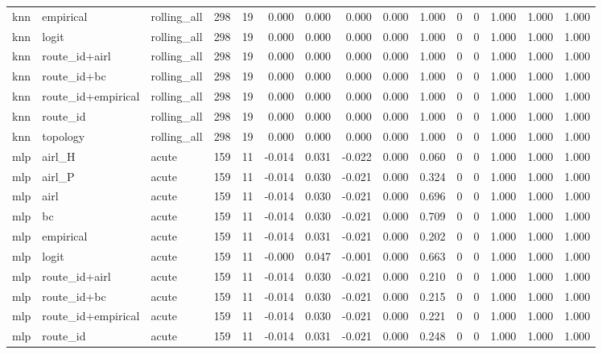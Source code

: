 \begin{tabular}{lllrrrrrrrrrrrr}
knn & empirical & rolling_all & 298 & 19 & 0.000 & 0.000 & 0.000 & 0.000 & 1.000 & 0 & 0 & 1.000 & 1.000 & 1.000 \\
knn & logit & rolling_all & 298 & 19 & 0.000 & 0.000 & 0.000 & 0.000 & 1.000 & 0 & 0 & 1.000 & 1.000 & 1.000 \\
knn & route_id+airl & rolling_all & 298 & 19 & 0.000 & 0.000 & 0.000 & 0.000 & 1.000 & 0 & 0 & 1.000 & 1.000 & 1.000 \\
knn & route_id+bc & rolling_all & 298 & 19 & 0.000 & 0.000 & 0.000 & 0.000 & 1.000 & 0 & 0 & 1.000 & 1.000 & 1.000 \\
knn & route_id+empirical & rolling_all & 298 & 19 & 0.000 & 0.000 & 0.000 & 0.000 & 1.000 & 0 & 0 & 1.000 & 1.000 & 1.000 \\
knn & route_id & rolling_all & 298 & 19 & 0.000 & 0.000 & 0.000 & 0.000 & 1.000 & 0 & 0 & 1.000 & 1.000 & 1.000 \\
knn & topology & rolling_all & 298 & 19 & 0.000 & 0.000 & 0.000 & 0.000 & 1.000 & 0 & 0 & 1.000 & 1.000 & 1.000 \\
mlp & airl_H & acute & 159 & 11 & -0.014 & 0.031 & -0.022 & 0.000 & 0.060 & 0 & 0 & 1.000 & 1.000 & 1.000 \\
mlp & airl_P & acute & 159 & 11 & -0.014 & 0.030 & -0.021 & 0.000 & 0.324 & 0 & 0 & 1.000 & 1.000 & 1.000 \\
mlp & airl & acute & 159 & 11 & -0.014 & 0.030 & -0.021 & 0.000 & 0.696 & 0 & 0 & 1.000 & 1.000 & 1.000 \\
mlp & bc & acute & 159 & 11 & -0.014 & 0.030 & -0.021 & 0.000 & 0.709 & 0 & 0 & 1.000 & 1.000 & 1.000 \\
mlp & empirical & acute & 159 & 11 & -0.014 & 0.031 & -0.021 & 0.000 & 0.202 & 0 & 0 & 1.000 & 1.000 & 1.000 \\
mlp & logit & acute & 159 & 11 & -0.000 & 0.047 & -0.001 & 0.000 & 0.663 & 0 & 0 & 1.000 & 1.000 & 1.000 \\
mlp & route_id+airl & acute & 159 & 11 & -0.014 & 0.030 & -0.021 & 0.000 & 0.210 & 0 & 0 & 1.000 & 1.000 & 1.000 \\
mlp & route_id+bc & acute & 159 & 11 & -0.014 & 0.030 & -0.021 & 0.000 & 0.215 & 0 & 0 & 1.000 & 1.000 & 1.000 \\
mlp & route_id+empirical & acute & 159 & 11 & -0.014 & 0.030 & -0.021 & 0.000 & 0.221 & 0 & 0 & 1.000 & 1.000 & 1.000 \\
mlp & route_id & acute & 159 & 11 & -0.014 & 0.031 & -0.021 & 0.000 & 0.248 & 0 & 0 & 1.000 & 1.000 & 1.000 \\

\end{tabular}
